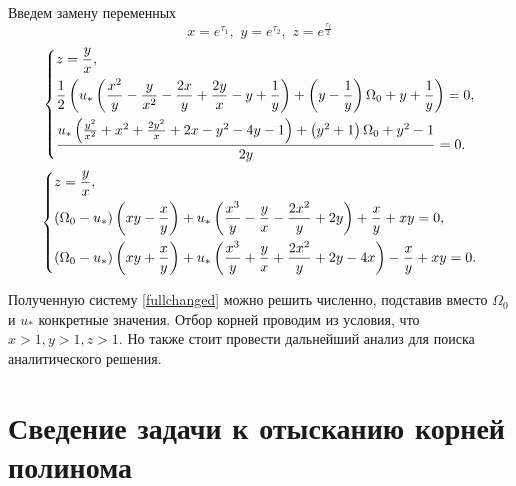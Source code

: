 \documentclass[a4paper,12pt, openany]{book}
\theoremstyle{plain} %
\theoremstyle{definition} %
\theoremstyle{remark} %
\numberwithin{equation}{chapter}
\begin{document}
{Введем замену переменных
\[
    x=e^{\tau_1} ,\,\,y=e^{\tau_2} ,\,\,z=e^{\frac{\tau_f}{2}}
\]
\[
    \left\{ {\begin{aligned}
                 & z=\frac{y}{x}, \hfill                                                         \\
                 & \frac{1}{2} \left(u_* \left(\frac{x^2}{y}-\frac{y}{x^2}-\frac{2 x}{y}+\frac{2
                        y}{x}-y+\frac{1}{y}\right)+\left(y-\frac{1}{y}\right) \Omega
                _0+y+\frac{1}{y}\right)=0, \hfill                                                \\
                 & \frac{u_* \left(\frac{y^2}{x^2}+x^2+\frac{2 y^2}{x}+2 x-y^2-4
                y-1\right)+\left(y^2+1\right) \Omega _0+y^2-1}{2 y}=0. \hfill                    \\
            \end{aligned}} \right.
\]
\begin{equation}\label{fullchanged}
    \left\{ {\begin{aligned}
                 & z=\frac{y}{x}, \hfill                                                                                                              \\
                 & (\Omega_0-u_*)\left( xy-\frac{x}{y}\right)+u_*\left(\frac{x^3}{y}-\frac{y}{x}-\frac{2x^2}{y}+2y\right)+\frac{x}{y}+xy=0, \hfill    \\
                 & (\Omega_0-u_*)\left( xy+\frac{x}{y}\right)+u_*\left(\frac{x^3}{y}+\frac{y}{x}+\frac{2x^2}{y}+2y-4x\right)-\frac{x}{y}+xy=0. \hfill \\
            \end{aligned}} \right.
\end{equation}

Полученную систему \eqref{fullchanged} можно решить численно, подставив вместо $\Omega_0$ и $u_\ast$ конкретные значения.
Отбор корней проводим из условия, что $x>1,y>1,z>1$.
Но также стоит провести дальнейший анализ для поиска аналитического решения.
\section{Сведение задачи к отысканию корней полинома}

}
\end{document}
